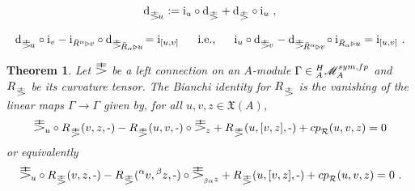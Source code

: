 \documentclass[10pt,a4paper]{amsart}
\newtheorem{theorem}{Theorem}
\def\AA{A}
\def\MMM{\mathscr{M}}
\def\Vect{\mathfrak{X}}
\def\al{\alpha}
\def\be{\beta}
\def\catfp{{{}^H_\AA\MMM_\AA^{\sym, \rm{fp}}}}
\def\dd{\mathrm{d}}
\def\ii{\mathrm{i}}
\def\oR{\bar R}
\def\pstd{{}^{\phantom{J}}_{\raisebox{\depth}{\scalebox{1.1}[-.75]{\mbox{${\mathbb
            \Delta}$}}}}}
\def\ra{\triangleright}
\def\stD{\dd\pstd}
\def\stDalpv{\stD{}_{\mbox{$\!{}^{}_{\oR^\al\ra v}\!$}}}
\def\stDalu{\stD{}_{\mbox{$\!{}^{}_{\oR_\al\ra u}\!$}}}
\def\stDu{\stD{}_{\mbox{$\!{}^{}_u$}}}
\def\stDv{\stD{}_{\mbox{$\!{}^{}_v$}}}
\def\std{{\raisebox{\depth}{\scalebox{1.45}[-1]{\mbox{$\mathbb \Delta$}}}}_{\!}}
\def\stdd{\phantom{\!\!\!\dd}\pstd}
\def\sym{{\rm{sym}}}
\begin{document}
\begin{equation}\label{defCD}
\stD{}_{\mbox{$\!{}^{}_u$}}:=\ii_u\circ \stD+\stD
\circ \ii_u~,
\end{equation}

\begin{equation}\label{CRID}
\stDu\circ \ii_v -\ii_{\oR^\al\ra v} \circ \stDalu=\ii_{[u,v]}~~~~\mbox{
  i.e., }~~~~ \ii_u \circ \stDv -\stDalpv\circ \ii_{\oR_\al\ra u} =\ii_{[u,v]}~.
\end{equation}

\begin{theorem}\label{BIANCHI2FORR}
Let $\std$ be a left connection on an $A$-module $\Gamma\in\catfp$ and $R\stdd$ be its curvature tensor. The Bianchi identity for  $R\stdd$ is the vanishing of the linear maps $\Gamma\to \Gamma$ given by,
for all $u,v,z\in \Vect(A)$,
$$
\std{}_u\circ R\stdd(v,z,\mbox{-})-R\stdd(u,v,\mbox{-})\circ \std{}_z + R\stdd(u,[v,z],\mbox{-})+cp^{}_{\mathcal{R}}(u,v,z)=0
$$
or equivalently
$$
\std{}_u\circ R\stdd(v,z,\mbox{-})-R\stdd({}^\al v,{}^\be z,\mbox{-})\circ \std{}^{}_{{}_{\be\al} z} + R\stdd(u,[v,z],\mbox{-})+cp^{}_{\mathcal{R}}(u,v,z)=0
~.$$\end{theorem}
\end{document}

